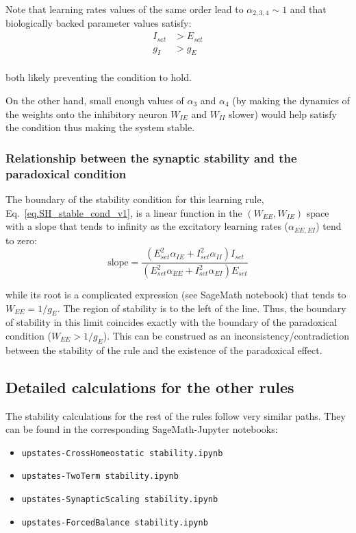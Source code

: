 \documentclass[twocolumn]{article}
\newcommand{\EE}{\mathit{EE}}
\newcommand{\EI}{\mathit{EI}}
\newcommand{\IE}{\mathit{IE}}
\newcommand{\II}{\mathit{II}}
\newcommand{\set}{\mathit{set}}
\begin{document}
Note that learning rates values of the same order lead to $\alpha_{2,3,4} \sim 1$ and that biologically backed parameter values satisfy: 
\begin{displaymath}
\begin{aligned}
I_{\set} & > E_{\set} \\
g_I & > g_E \\
\end{aligned}
\end{displaymath}

\noindent both likely preventing the condition to hold.

On the other hand, small enough values of $\alpha_3$ and $\alpha_4$ (by making the dynamics of the weights onto the inhibitory neuron $W_{\IE}$ and $W_{\II}$ slower) would help satisfy the condition thus making the system stable.




\subsubsection{Relationship between the synaptic stability and the paradoxical condition}

The boundary of the stability condition for this learning rule, Eq.\ \ref{eq.SH_stable_cond_v1}, is a linear function in the $(W_{\EE},W_{\IE})$ space with a slope that tends to infinity as the excitatory learning rates ($\alpha_{\EE,\EI}$) tend to zero:
\begin{displaymath}
\mbox{slope} = \frac{(E_{\set}^2 \alpha_{\IE} + I_{\set}^2\alpha_{\II})I_{\set}}{(E_{\set}^2\alpha_{\EE} + I_{\set}^2\alpha_{\EI})E_{\set}}
\end{displaymath}

\noindent while its root is a complicated expression (see SageMath notebook) that tends to $W_{\EE} = 1/g_E$. The region of stability is to the left of the line. Thus, the boundary of stability in this limit coincides exactly with the boundary of the paradoxical condition ($W_{\EE}>1/g_E$). This can be construed as an inconsistency/contradiction between the stability of the rule and the existence of the paradoxical effect.




\subsection{Detailed calculations for the other rules}
\label{sec.otherRules_details}

The stability calculations for the rest of the rules follow very similar paths. They can be found in the corresponding SageMath-Jupyter notebooks:
\begin{itemize}
\item[] {\tt upstates-CrossHomeostatic stability.ipynb}
\item[] {\tt upstates-TwoTerm stability.ipynb}
\item[] {\tt upstates-SynapticScaling stability.ipynb}
\item[] {\tt upstates-ForcedBalance stability.ipynb}
\end{itemize}
\end{document}

